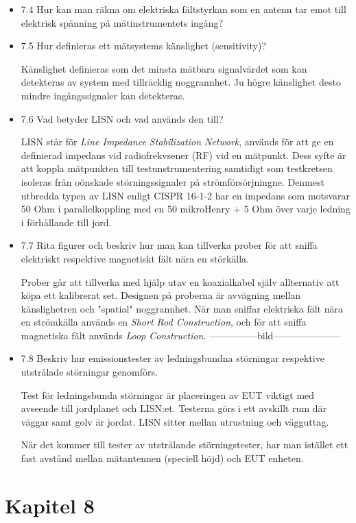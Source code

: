 \documentclass{article}
\begin{document}
\begin{itemize}
\item 7.4 Hur kan man räkna om elektriska fältstyrkan som en antenn tar emot till elektrisk spänning på mätinstrumentets ingång?


\item 7.5 Hur definieras ett mätsystems känslighet (sensitivity)?

Känslighet definieras som det minsta mätbara signalvärdet som kan detekteras av system med tillräcklig noggrannhet. Ju högre känslighet desto mindre ingångssignaler kan detekteras.

\item 7.6 Vad betyder LISN och vad används den till?

LISN står för \textit{Line Impedance Stabilization Network}, används för att ge en definierad impedans vid radiofrekvsener (RF) vid en mätpunkt. Dess syfte är att koppla mätpunkten till testunstrumentering samtidigt som testkretsen isoleras från oönskade störningssignaler på strömförsörjningne. Denmest utbredda typen av LISN enligt CISPR 16-1-2 har en impedans som motsvarar 50 Ohm i parallelkoppling med en 50 mikroHenry + 5 Ohm över varje ledning i förhållande till jord.

\item 7.7 Rita figurer och beskriv hur man kan tillverka prober för att sniffa elektriskt respektive magnetiskt fält nära en störkälla.

Prober går att tillverka med hjälp utav en koaxialkabel själv allternativ att köpa ett kalibrerat set. Designen på proberna är avvägning mellan känslighetren och "spatial" noggrannhet. 
När man sniffar elektriska fält nära en strömkälla används en \textit{Short Rod Construction}, och för att sniffa magnetiska fält används \textit{Loop Construction}. 
---------------bild---------------------


\item 7.8 Beskriv hur emissionstester av ledningsbundna störningar respektive utstrålade störningar genomförs.

Test för ledningsbunda störningar är placeringen av EUT viktigt med avseende till jordplanet och LISN:et. Testerna görs i ett avskillt rum där väggar samt golv är jordat. LISN sitter mellan utrustning och vägguttag. 

När det kommer till tester av utstrålande störningstester, har man istället ett fast avstånd mellan mätantennen (speciell höjd) och EUT enheten.
\end{itemize}
\section{Kapitel 8}
\end{document}
